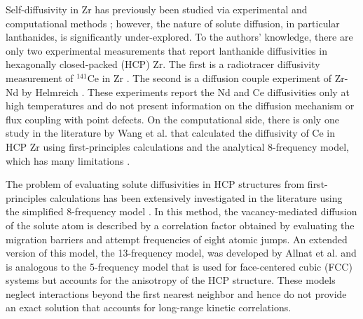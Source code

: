 \documentclass[preprint,12pt]{elsarticle}
\begin{document}
Self-diffusivity in Zr has previously been studied via experimental \cite{hood_alpha-zr_1995, hood_self-_1997} and computational methods \cite{samolyuk_analysis_2014, verite_anisotropy_2007, pasianot_issues_2012}; however, the nature of solute diffusion, in particular lanthanides, is significantly under-explored. To the authors' knowledge, there are only two experimental measurements that report lanthanide diffusivities in hexagonally closed-packed (HCP) Zr. The first is a radiotracer diffusivity measurement of $^{141}$Ce in Zr \cite{paul_diffusion_1968}. The second is a diffusion couple experiment of Zr-Nd by Helmreich \cite{helmreich_diffusion_2014}. These experiments report the Nd and Ce diffusivities only at high temperatures and do not present information on the diffusion mechanism or flux coupling with point defects. On the computational side, there is only one study in the literature by Wang et al. \cite{wang_first_2019} that calculated the diffusivity of Ce in HCP Zr using first-principles calculations and the analytical 8-frequency model, which has many limitations \cite{agarwal_exact_2017}. 

The problem of evaluating solute diffusivities in HCP structures from first-principles calculations has been extensively investigated in the literature \cite{ganeshan_first-principles_2011, lu_first-principles_2018, wang_first_2019} using the simplified 8-frequency model \cite{ghate_screened_1964, batra_anisotropic_1967}. In this method, the vacancy-mediated diffusion of the solute atom is described by a correlation factor obtained by evaluating the migration barriers and attempt frequencies of eight atomic jumps. An extended version of this model, the 13-frequency model, was developed by Allnat et al. \cite{allnatt_atomic_2003} and is analogous to the 5-frequency model that is used for face-centered cubic (FCC) systems but accounts for the anisotropy of the HCP structure. These models neglect interactions beyond the first nearest neighbor and hence do not provide an exact solution that accounts for long-range kinetic correlations. 
\end{document}
